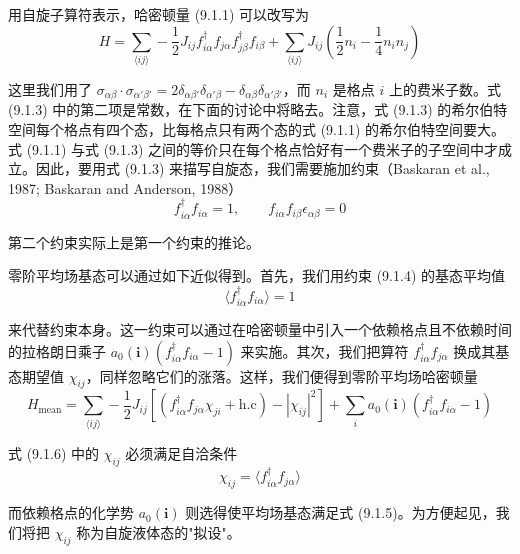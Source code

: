 用自旋子算符表示，哈密顿量 (9.1.1) 可以改写为
\begin{equation*}
H=\sum_{\langle ij\rangle}-\frac{1}{2}J_{ij}f^{\dagger}_{i\alpha}f_{j\alpha}f^{\dagger}_{j\beta}f_{i\beta}+\sum_{\langle ij\rangle}J_{ij}\left(\frac{1}{2}n_i-\frac{1}{4}n_in_j\right)
\tag{9.1.3}
\end{equation*}

这里我们用了 $\sigma_{\alpha\beta}\cdot\sigma_{\alpha'\beta'}=2\delta_{\alpha\beta'}\delta_{\alpha'\beta}-\delta_{\alpha\beta}\delta_{\alpha'\beta'}$，而 $n_i$ 是格点 $i$ 上的费米子数。式 (9.1.3) 中的第二项是常数，在下面的讨论中将略去。注意，式 (9.1.3) 的希尔伯特空间每个格点有四个态，比每格点只有两个态的式 (9.1.1) 的希尔伯特空间要大。式 (9.1.1) 与式 (9.1.3) 之间的等价只在每个格点恰好有一个费米子的子空间中才成立。因此，要用式 (9.1.3) 来描写自旋态，我们需要施加约束（Baskaran et al., 1987; Baskaran and Anderson, 1988）
\begin{equation*}
f^{\dagger}_{i\alpha}f_{i\alpha}=1,\qquad f_{i\alpha}f_{i\beta}\epsilon_{\alpha\beta}=0
\tag{9.1.4}
\end{equation*}

第二个约束实际上是第一个约束的推论。

零阶平均场基态可以通过如下近似得到。首先，我们用约束 (9.1.4) 的基态平均值
\begin{equation*}
\langle f^{\dagger}_{i\alpha}f_{i\alpha}\rangle=1
\tag{9.1.5}
\end{equation*}

来代替约束本身。这一约束可以通过在哈密顿量中引入一个依赖格点且不依赖时间的拉格朗日乘子 $a_0(\pmb{i})(f^{\dagger}_{i\alpha}f_{i\alpha}-1)$ 来实施。其次，我们把算符 $f^{\dagger}_{i\alpha}f_{j\alpha}$ 换成其基态期望值 $\chi_{ij}$，同样忽略它们的涨落。这样，我们便得到零阶平均场哈密顿量
\begin{equation*}
H_{\text{mean}}=\sum_{\langle ij\rangle}-\frac{1}{2}J_{ij}\left[\left(f^{\dagger}_{i\alpha}f_{j\alpha}\chi_{ji}+\text{h.c}\right)-|\chi_{ij}|^{2}\right]+\sum_{i}a_0(\pmb{i})\left(f^{\dagger}_{i\alpha}f_{i\alpha}-1\right)
\tag{9.1.6}
\end{equation*}

式 (9.1.6) 中的 $\chi_{ij}$ 必须满足自洽条件
\begin{equation*}
\chi_{ij}=\langle f^{\dagger}_{i\alpha}f_{j\alpha}\rangle
\tag{9.1.7}
\end{equation*}

而依赖格点的化学势 $a_0(\pmb{i})$ 则选得使平均场基态满足式 (9.1.5)。为方便起见，我们将把 $\chi_{ij}$ 称为自旋液体态的"拟设"。

